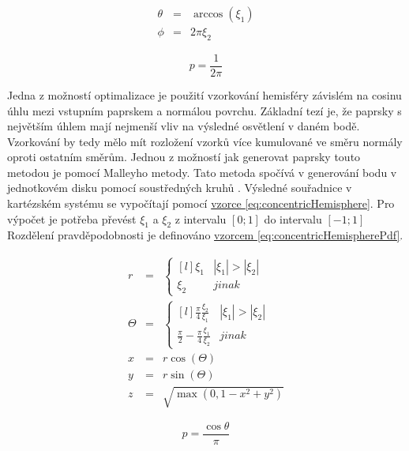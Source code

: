\documentclass[czech,master,dept460,male,cpp,cpdeclaration]{diploma}
\newcommand{\interval}[1]{\left[{#1}\right]}
\newcommand{\randU}{\xi_{1}}
\newcommand{\randV}{\xi_{2}}
\begin{document}
\begin{eqnarray}
    \theta & = & \arccos(\randU) \nonumber \\
    \phi & = & 2\pi\randV \label{eq:hemisphereSampling}
\end{eqnarray}

\begin{equation} \label{eq:hemisphereSamplingPdf}
    p = \frac{1}{2\pi}
\end{equation}

Jedna z možností optimalizace je použití vzorkování hemisféry závislém na cosinu úhlu mezi vstupním paprskem a normálou povrchu. Základní tezí je, že paprsky s největším úhlem mají nejmenší vliv na výsledné osvětlení v daném bodě. Vzorkování by tedy mělo mít rozložení vzorků více kumulované ve směru normály oproti ostatním směrům. Jednou z možností jak generovat paprsky touto metodou je pomocí Malleyho metody. Tato metoda spočívá v generování bodu v jednotkovém disku pomocí soustředných kruhů \cite{PHARR2017747}. Výsledné souřadnice v kartézském systému se vypočítají pomocí \hyperref[eq:concentricHemisphere]{vzorce \ref{eq:concentricHemisphere}}. Pro výpočet je potřeba převést $\randU$ a $\randV$ z intervalu $\interval{0;1}$ do intervalu $\interval{-1;1}$  Rozdělení pravděpodobnosti je definováno \hyperref[eq:concentricHemisphere]{vzorcem \ref{eq:concentricHemispherePdf}}.

\begin{eqnarray}
    r & = & \left\{\begin{matrix*}[l] \randU & |\randU| > \left | \randV \right |\\ \randV & jinak \end{matrix*}\right. \nonumber \\
    \Theta & = & \left\{\begin{matrix*}[l] \frac{\pi}{4}\frac{\randV}{\randU} & |\randU| > \left | \randV \right |\\ \frac{\pi}{2}-\frac{\pi}{4}\frac{\randU}{\randV} & jinak \end{matrix*}\right. \nonumber \\
    x & = &r\cos(\Theta)\nonumber \\
    y & = &r\sin(\Theta)\nonumber \\
    z & = &\sqrt{ \max(0, 1 - x^2 + y^2) }\label{eq:concentricHemisphere}
\end{eqnarray}

\begin{equation} \label{eq:concentricHemispherePdf}
    p = \frac{\cos\theta}{\pi}
\end{equation}
\end{document}
